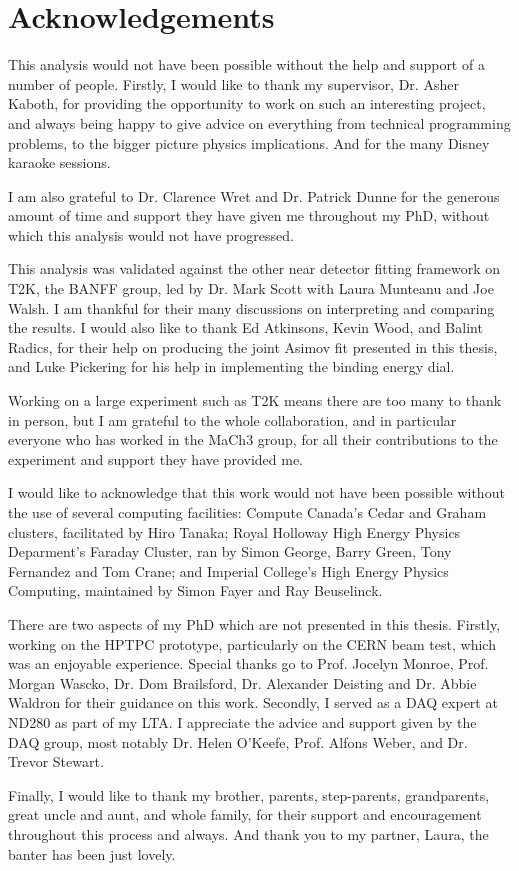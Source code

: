\chapter*{Acknowledgements}

This analysis would not have been possible without the help and support of a number of people. Firstly, I would like to thank my supervisor, Dr. Asher Kaboth, for providing the opportunity to work on such an interesting project, and always being happy to give advice on everything from technical programming problems, to the bigger picture physics implications. And for the many Disney karaoke sessions.

I am also grateful to Dr. Clarence Wret and Dr. Patrick Dunne for the generous amount of time and support they have given me throughout my PhD, without which this analysis would not have progressed.

This analysis was validated against the other near detector fitting framework on T2K, the BANFF group, led by Dr. Mark Scott with Laura Munteanu and Joe Walsh. I am thankful for their many discussions on interpreting and comparing the results. I would also like to thank Ed Atkinsons, Kevin Wood, and Balint Radics, for their help on producing the joint Asimov fit presented in this thesis, and Luke Pickering for his help in implementing the binding energy dial.

Working on a large experiment such as T2K means there are too many to thank in person, but I am grateful to the whole collaboration, and in particular everyone who has worked in the MaCh3 group, for all their contributions to the experiment and support they have provided me.

I would like to acknowledge that this work would not have been possible without the use of several computing facilities: Compute Canada's Cedar and Graham clusters, facilitated by Hiro Tanaka; Royal Holloway High Energy Physics Deparment's Faraday Cluster, ran by Simon George, Barry Green, Tony Fernandez and Tom Crane; and Imperial College's High Energy Physics Computing, maintained by Simon Fayer and Ray Beuselinck.

There are two aspects of my PhD which are not presented in this thesis. Firstly, working on the HPTPC prototype, particularly on the CERN beam test, which was an enjoyable experience. Special thanks go to Prof. Jocelyn Monroe, Prof. Morgan Wascko, Dr. Dom Brailsford, Dr. Alexander Deisting and Dr. Abbie Waldron for their guidance on this work. Secondly, I served as a DAQ expert at ND280 as part of my LTA. I appreciate the advice and support given by the DAQ group, most notably Dr. Helen O'Keefe, Prof. Alfons Weber, and Dr. Trevor Stewart.

Finally, I would like to thank my brother, parents, step-parents, grandparents, great uncle and aunt, and whole family, for their support and encouragement throughout this process and always. And thank you to my partner, Laura, the banter has been just lovely.

\newpage